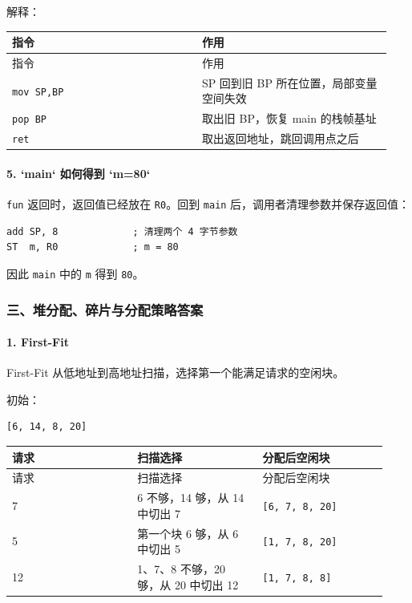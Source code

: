 \documentclass[UTF8]{ctexart}
\begin{document}
解释：

\begin{longtable}{|p{0.47\linewidth}|p{0.47\linewidth}|}
\hline
指令 & 作用 \\
\hline
\endfirsthead
指令 & 作用 \\
\hline
\endhead
\texttt{mov SP,BP} & SP 回到旧 BP 所在位置，局部变量空间失效 \\
\hline
\texttt{pop BP} & 取出旧 BP，恢复 main 的栈帧基址 \\
\hline
\texttt{ret} & 取出返回地址，跳回调用点之后 \\
\hline
\end{longtable}

\paragraph*{5. `main` 如何得到 `m=80`}

\texttt{fun} 返回时，返回值已经放在 \texttt{R0}。回到 \texttt{main} 后，调用者清理参数并保存返回值：

\begin{Verbatim}[fontsize=\small,breaklines=true]
add SP, 8             ; 清理两个 4 字节参数
ST  m, R0             ; m = 80
\end{Verbatim}

因此 \texttt{main} 中的 \texttt{m} 得到 \texttt{80}。

\subsubsection*{三、堆分配、碎片与分配策略答案}

\paragraph*{1. First-Fit}

First-Fit 从低地址到高地址扫描，选择第一个能满足请求的空闲块。

初始：

\begin{Verbatim}[fontsize=\small,breaklines=true]
[6, 14, 8, 20]
\end{Verbatim}

\begin{longtable}{|p{0.31\linewidth}|p{0.31\linewidth}|p{0.31\linewidth}|}
\hline
请求 & 扫描选择 & 分配后空闲块 \\
\hline
\endfirsthead
请求 & 扫描选择 & 分配后空闲块 \\
\hline
\endhead
7 & 6 不够，14 够，从 14 中切出 7 & \texttt{[6, 7, 8, 20]} \\
\hline
5 & 第一个块 6 够，从 6 中切出 5 & \texttt{[1, 7, 8, 20]} \\
\hline
12 & 1、7、8 不够，20 够，从 20 中切出 12 & \texttt{[1, 7, 8, 8]} \\
\hline
\end{longtable}
\end{document}
